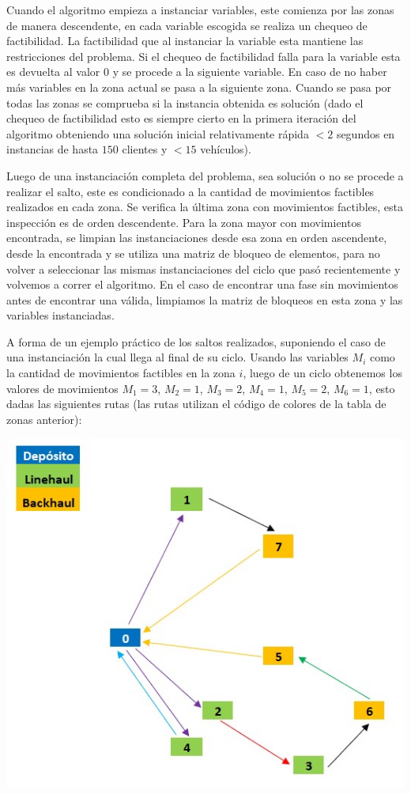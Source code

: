 \documentclass[letter, 10pt]{article}
\begin{document}
Cuando el algoritmo empieza a instanciar variables, este comienza por las zonas de manera descendente, en cada variable escogida se realiza un chequeo de factibilidad. La factibilidad que al instanciar la variable esta mantiene las restricciones del problema. Si el chequeo de factibilidad falla para la variable esta es devuelta al valor $0$ y se procede a la siguiente variable. En caso de no haber más variables en la zona actual se pasa a la siguiente zona. Cuando se pasa por todas las zonas se comprueba si la instancia obtenida es solución (dado el chequeo de factibilidad esto es siempre cierto en la primera iteración del algoritmo obteniendo una solución inicial relativamente rápida $<2$ segundos en instancias de hasta $150$ clientes y $<15$ vehículos).

Luego de una instanciación completa del problema, sea solución o no se procede a realizar el salto, este es condicionado a la cantidad de movimientos factibles realizados en cada zona. Se verifica la última zona con movimientos factibles, esta inspección es de orden descendente. Para la zona mayor con movimientos encontrada, se limpian las instanciaciones desde esa zona en orden ascendente, desde la encontrada y se utiliza una matriz de bloqueo de elementos, para no volver a seleccionar las mismas instanciaciones del ciclo que pasó recientemente y volvemos a correr el algoritmo. En el caso de encontrar una fase sin movimientos antes de encontrar una válida, limpiamos la matriz de bloqueos en esta zona y las variables instanciadas.

A forma de un ejemplo práctico de los saltos realizados, suponiendo el caso de una instanciación la cual llega al final de su ciclo. Usando las variables $M_i$ como la cantidad de movimientos factibles en la zona $i$, luego de un ciclo obtenemos los valores de movimientos $M_1=3$, $M_2=1$, $M_3=2$, $M_4=1$, $M_5=2$, $M_6=1$, esto dadas las siguientes rutas (las rutas utilizan el código de colores de la tabla de zonas anterior):

\begin{center}
\includegraphics[scale=.5]{ruta_fases.jpg}
\end{center}
\end{document}
